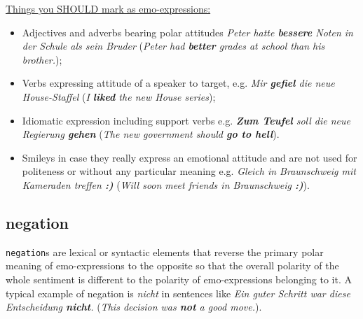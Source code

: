 \documentclass[11pt,a4paper]{article}
\begin{document}
\underline{Things you SHOULD mark as emo-expressions:}
\begin{itemize}
  \item Adjectives and adverbs bearing polar attitudes \textit{Peter
    hatte \textbf{bessere} Noten in der Schule als sein Bruder}
    (\textit{Peter had \textbf{better} grades at school than his
    brother.});

  \item Verbs expressing attitude of a speaker to target,
    e.g. \textit{Mir \textbf{gefiel} die neue House-Staffel}
    (\textit{I \textbf{liked} the new House series});

  \item Idiomatic expression including support verbs
    e.g. \textit{\textbf{Zum Teufel} soll die neue Regierung
      \textbf{gehen}} (\textit{The new government should \textbf{go to
        hell}}).

  \item Smileys in case they really express an emotional attitude and
    are not used for politeness or without any particular meaning
    e.g. \textit{Gleich in Braunschweig mit Kameraden treffen
        \textbf{:)}} (\textit{Will soon meet friends in Braunschweig
        \textbf{:)}}).
\end{itemize}




\subsection{negation}
\texttt{negation}s are lexical or syntactic elements that
reverse the primary polar meaning of emo-expressions to the opposite
so that the overall polarity of the whole sentiment is different to
the polarity of emo-expressions belonging to it. A typical example of
negation is \textit{nicht} in sentences like \textit{Ein guter Schritt
  war diese Entscheidung \textbf{nicht}.} (\textit{This decision was
  \textbf{not} a good move.}).
\end{document}
